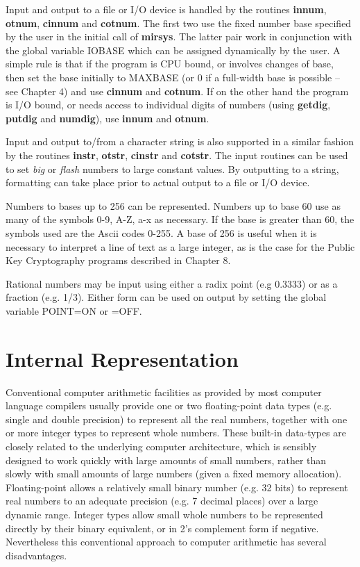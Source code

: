       Input and output to a file or I/O device is handled by the routines {\bf 
      innum}, {\bf otnum},  {\bf cinnum} and {\bf cotnum}. The first two use 
      the fixed number base specified by the user in  the  initial call of 
      {\bf mirsys}. The latter pair work in conjunction with the global 
      variable IOBASE which can be assigned dynamically  by the  user.  A  
      simple  rule  is that if the program is CPU bound,  or involves changes 
      of base,  then set the base initially to MAXBASE  (or 0 if a full-width 
      base is possible -- see Chapter 4) and use {\bf cinnum} and 
      {\bf cotnum}. If on the other hand the program is I/O bound, 
      or needs access to individual digits of numbers (using {\bf getdig}, 
      {\bf putdig} and {\bf numdig}), use {\bf innum} and {\bf otnum}. 

      Input and output to/from a character string is also supported in a 
      similar fashion by the routines
      {\bf instr}, {\bf otstr}, {\bf cinstr} and {\bf cotstr}.
      The input routines can be used to set {\em big} or {\em flash} 
      numbers  to  large  constant values.  By outputting to a string, 
      formatting can take place prior to actual output to a file or I/O 
      device. 

      Numbers to bases up to 256 can be represented.  Numbers up to base 60 
      use as many of the symbols 0-9, A-Z, a-x as necessary. If the base is 
      greater than 60,  the symbols used are the Ascii codes 0-255.  A base 
      of 256 is useful when it is necessary to interpret a line of text as 
      a large integer,  as is the case  for  the  Public  Key  Cryptography 
      programs described in Chapter 8.  

      Rational numbers may be input using either a radix point (e.g 0.3333) 
      or  as  a fraction (e.g.  1/3).  Either form can be used on output by 
      setting the global variable POINT=ON or =OFF. 


\cleardoublepage
\chapter {Internal Representation}

      Conventional computer  arithmetic  facilities  as  provided  by  most 
      computer language compilers usually provide one or two floating-point 
      data  types  (e.g.  single and double precision) to represent all the 
      real numbers,  together with one or more integer types  to  represent 
      whole  numbers.  These built-in data-types are closely related to the 
      underlying computer architecture,  which is sensibly designed to work 
      quickly with large amounts of small numbers,  rather than slowly with 
      small amounts of large numbers (given  a  fixed  memory  allocation). 
      Floating-point allows a relatively small binary number (e.g. 32 bits) 
      to  represent  real numbers to an adequate precision (e.g.  7 decimal 
      places) over a large dynamic range.  Integer types allow small  whole 
      numbers to be represented directly by their binary equivalent,  or in 
      2's complement  form  if  negative.  Nevertheless  this  conventional 
      approach to computer arithmetic has several disadvantages.  

